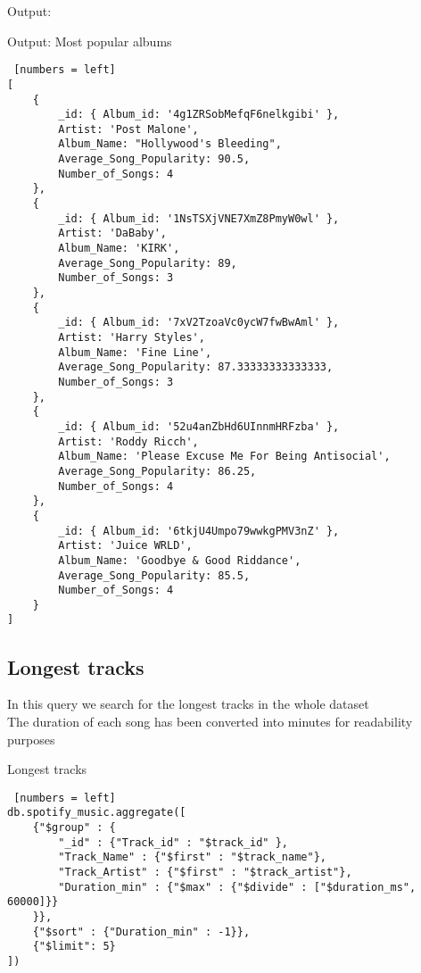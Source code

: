Output:
\begin{algorithm}[h!]
\caption{Output: Most popular albums}
\begin{lstlisting} [numbers = left]
[
	{
		_id: { Album_id: '4g1ZRSobMefqF6nelkgibi' },
		Artist: 'Post Malone',
		Album_Name: "Hollywood's Bleeding",
		Average_Song_Popularity: 90.5,
		Number_of_Songs: 4
	},
	{
		_id: { Album_id: '1NsTSXjVNE7XmZ8PmyW0wl' },
		Artist: 'DaBaby',
		Album_Name: 'KIRK',
		Average_Song_Popularity: 89,
		Number_of_Songs: 3
	},
	{
		_id: { Album_id: '7xV2TzoaVc0ycW7fwBwAml' },
		Artist: 'Harry Styles',
		Album_Name: 'Fine Line',
		Average_Song_Popularity: 87.33333333333333,
		Number_of_Songs: 3
	},
	{
		_id: { Album_id: '52u4anZbHd6UInnmHRFzba' },
		Artist: 'Roddy Ricch',
		Album_Name: 'Please Excuse Me For Being Antisocial',
		Average_Song_Popularity: 86.25,
		Number_of_Songs: 4
	},
	{
		_id: { Album_id: '6tkjU4Umpo79wwkgPMV3nZ' },
		Artist: 'Juice WRLD',
		Album_Name: 'Goodbye & Good Riddance',
		Average_Song_Popularity: 85.5,
		Number_of_Songs: 4
	}
]
\end{lstlisting}
\end{algorithm}
\newpage
\restoregeometry

\subsection{Longest tracks}
In this query we search for the longest tracks in the whole dataset\\
The duration of each song has been converted into minutes for readability purposes\\
\begin{algorithm}[ht]
\caption{Longest tracks}
\begin{lstlisting} [numbers = left]
db.spotify_music.aggregate([
	{"$group" : {
		"_id" : {"Track_id" : "$track_id" },
		"Track_Name" : {"$first" : "$track_name"},
		"Track_Artist" : {"$first" : "$track_artist"},
		"Duration_min" : {"$max" : {"$divide" : ["$duration_ms", 60000]}}
	}},
	{"$sort" : {"Duration_min" : -1}},
	{"$limit": 5}
])
\end{lstlisting}
\end{algorithm}
\newpage

